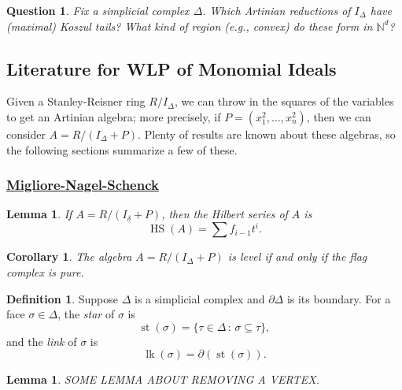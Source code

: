 \documentclass[12pt,a4paper]{article}
\newcommand{\NN}{\mathbb{N}}
\DeclareMathOperator{\HS}{HS}
\DeclareMathOperator{\sstar}{\text{st}}
\DeclareMathOperator{\link}{\text{lk}}
\newtheorem{lemma}[theorem]{Lemma}
\newtheorem{corollary}[theorem]{Corollary}
\newtheorem{question}[theorem]{Question}
\theoremstyle{definition}
\newtheorem{definition}[theorem]{Definition}
\numberwithin{equation}{section}
\begin{document}
\begin{question}
    Fix a simplicial complex $\Delta$.
    Which Artinian reductions of $I_\Delta$ have (maximal) Koszul tails?
    What kind of region (e.g., convex) do these form in $\NN^d$?
\end{question}


\subsection{Literature for WLP of Monomial Ideals}
Given a Stanley-Reisner ring $R/I_\Delta$, we can throw in the squares of the variables to get an Artinian algebra; more precisely, if $P = (x_1^2,\dots,x_n^2)$, then we can consider $A = R/(I_\Delta + P)$.
Plenty of results are known about these algebras, so the following sections summarize a few of these.

\subsubsection{\href{https://arxiv.org/abs/1706.05058}{Migliore-Nagel-Schenck}}
\begin{lemma}{\cite[Lemma 2.1]{migliore_weak_2020}}
    If $A = R/(I_\delta + P)$, then the Hilbert series of $A$ is
    \begin{equation*}
        \HS(A) = \sum f_{i-1} t^i.
    \end{equation*}
\end{lemma}

\begin{corollary}{\cite[Corollary 2.2]{migliore_weak_2020}}
    The algebra $A = R/(I_\Delta + P)$ is level if and only if the flag complex is pure.
\end{corollary}

\begin{definition}
    Suppose $\Delta$ is a simplicial complex and $\partial \Delta$ is its boundary.
    For a face $\sigma \in \Delta$, the \emph{star} of $\sigma$ is
    \begin{equation*}
        \sstar(\sigma) = \{ \tau \in \Delta \, \colon \, \sigma \subseteq \tau \},
    \end{equation*}    
    and the \emph{link} of $\sigma$ is
    \begin{equation*}
        \link(\sigma) = \partial(\sstar(\sigma)).
    \end{equation*}
\end{definition}

\begin{lemma}{\cite[Lemma 2.3]{migliore_weak_2020}}
    SOME LEMMA ABOUT REMOVING A VERTEX.
\end{lemma}
\end{document}
